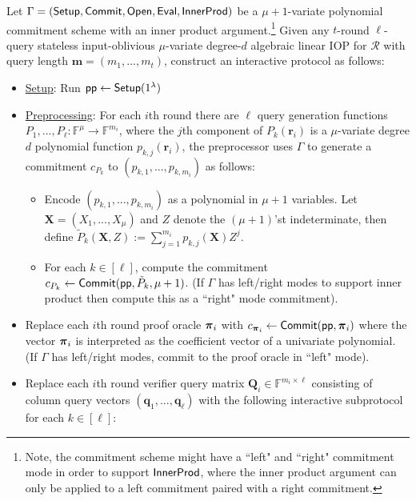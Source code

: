 Let $\Gamma = (\textsf{{Setup}}, \textsf{{Commit}}, \textsf{{Open}}, \textsf{{Eval}}, \textsf{{InnerProd}})$ be a $\mu+1$-variate polynomial commitment scheme with an inner product argument.\footnote{Note, the commitment scheme might have a ``left" and ``right" commitment mode in order to support $\textsf{{InnerProd}}$, where the inner product argument can only be applied to a left commitment paired with a right commitment.} Given any $t$-round $\ell$-query stateless input-oblivious $\mu$-variate degree-$d$ algebraic linear IOP for $\mathcal{R}$ with query length $\mathbf{m} = (m_1,...,m_t)$, construct an interactive protocol as follows: 

\begin{itemize}

\item \underline{Setup}: Run $\textsf{pp} \leftarrow \textsf{{Setup}}(1^\lambda)$

\item \underline{Preprocessing}: For each $i$th round there are $\ell$ query generation functions $P_1,...,P_\ell: \mathbb{F}^\mu \rightarrow \mathbb{F}^{m_i}$, where the $j$th component of $P_k(\mathbf{r}_i)$ is a $\mu$-variate degree $d$ polynomial function $p_{k,j}(\mathbf{r}_i)$, the preprocessor uses $\Gamma$ to generate a commitment $c_{P_k}$ to $(p_{k,1},..., p_{k,m_i})$ as follows:
 
    \begin{itemize}
    \item Encode $(p_{k,1},...,p_{k, m_i})$ as a polynomial in $\mu + 1$ variables. Let $\mathbf{X} = (X_1,...,X_\mu)$ and $Z$ denote the $(\mu+1)$'st indeterminate, then define $\tilde{P}_k(\mathbf{X}, Z) := \sum_{j=1}^{m_i} p_{k,j}(\mathbf{X}) Z^j$.
    
    \item For each $k \in [\ell]$, compute the commitment $c_{P_k} \leftarrow \textsf{{Commit}}(\textsf{pp}, \tilde{P}_k, \mu + 1)$. (If $\Gamma$ has left/right modes to support inner product then compute this as a ``right" mode commitment). 
    \end{itemize}
    
\item Replace each $i$th round proof oracle $\boldsymbol{\pi}_i$ with $c_{\boldsymbol{\pi}_i} \leftarrow \textsf{{Commit}}(\textsf{pp}, \boldsymbol{\pi}_i)$ where the vector $\boldsymbol{\pi}_i$ is interpreted as the coefficient vector of a univariate polynomial. (If $\Gamma$ has left/right modes, commit to the proof oracle in ``left" mode). 

\item Replace each $i$th round verifier query matrix $\mathbf{Q}_i \in \mathbb{F}^{m_i \times \ell}$ consisting of column query vectors $(\mathbf{q}_1,...,\mathbf{q}_\ell)$ with the following interactive subprotocol for each $k \in [\ell]$: 


\end{itemize}
